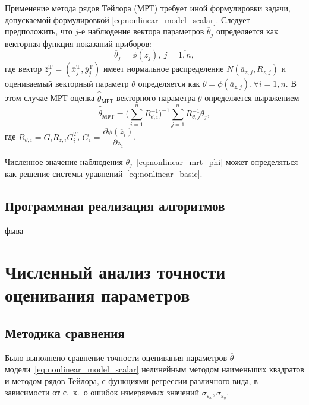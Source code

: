 Применение метода рядов Тейлора (МРТ) требует иной формулировки задачи,
допускаемой формулировкой \eqref{eq:nonlinear_model_scalar}.
Следует предположить, что \( j \)-е наблюдение вектора параметров \( \overline{\theta}_j \)
определяется как векторная функция показаний приборов:
\begin{equation}
  \label{eq:nonlinear_mrt_phi}
  \overline{\theta}_j = \phi( \overline{z}_{j} ), \: j = \overline{1, n},
\end{equation}
где вектор
\( \overline{z}^{\text{T}}_{j} =
( \overline{x}^{\text{T}}_{j}, \overline{y}^{\text{T}}_{j}) \)
имеет нормальное распределение \( N(\overline{a}_{z,j}, R_{z,j}) \)
и оцениваемый векторный параметр \( \overline{\theta} \) определяется как
\( \overline{\theta} = \phi(\overline{a}_{z,j}), \forall i = \overline{1, n} \).
В этом случае МРТ-оценка \( \hat{\overline{\theta}}_{\text{МРТ}} \) векторного параметра \( \overline{\theta} \)
определяется выражением
\begin{equation*}
  \hat{\overline{\theta}}_{\text{МРТ}} =
  \Bigg( \sum^{n}_{i=1} R^{-1}_{\theta,i} \Bigg)^{-1}
  \sum^{n}_{j=1} R^{-1}_{\theta,j} \overline{\theta}_j,
\end{equation*}
где
\( R_{\theta,i} = G_i R_{z,i} G^T_i \),
\( G_i =
\dfrac{\partial \phi( \overline{z}_{i} ) }{ \partial \overline{z}_{i} } \).

Численное значение наблюдения \( \theta_j \)~\eqref{eq:nonlinear_mrt_phi} может определяться как
решение системы уравнений~\eqref{eq:nonlinear_basic}.

\vspace{2\baselineskip}
\subsection{Программная реализация алгоритмов}

фыва

\section{Численный анализ точности оценивания параметров}

\subsection{Методика сравнения}\label{subsec:nonlinear_comparison_conditions}

Было выполнено сравнение точности оценивания параметров \( \overline{\theta} \)
модели~\eqref{eq:nonlinear_model_scalar}
нелинейным методом наименьших квадратов и методом рядов Тейлора,
с функциями регрессии различного вида,
в зависимости от с.~к.~о ошибок измеряемых значений
\( \sigma_{\varepsilon_x}, \sigma_{\varepsilon_y} \).

